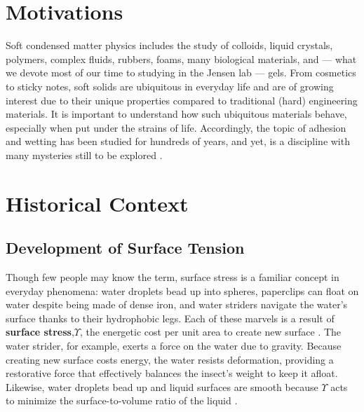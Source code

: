 

\section{Motivations}
Soft condensed matter physics includes the study of colloids, liquid crystals, polymers, complex fluids, rubbers, foams, many biological materials, and --- what we devote most of our time to studying in the Jensen lab --- gels. From cosmetics to sticky notes, soft solids are ubiquitous in everyday life and are of growing interest due to their unique properties compared to traditional (hard) engineering materials.  It is important to understand how such ubiquitous materials behave, especially when put under the strains of life. Accordingly, the topic of adhesion and wetting has been studied for hundreds of years, and yet, is a discipline with many mysteries still to be explored  \cite{GennesPierre-Gillesde2003Cawp}. 

 
\section{Historical Context}
\subsection{Development of Surface Tension}
Though few people may know the term, surface stress is a familiar concept in everyday phenomena: water droplets bead up into spheres, paperclips can float on water despite being made of dense iron, and water striders navigate the water's surface thanks to their hydrophobic legs. Each of these marvels is a result of \textbf{surface stress},$\Upsilon$, the  energetic cost per unit area to create new surface \cite{cammarata1994surface}. The water strider, for example, exerts a force on the water due to gravity. Because creating new surface costs energy, the water resists deformation, providing a restorative force that effectively balances the insect’s weight to keep it afloat. Likewise, water droplets bead up and liquid surfaces are smooth because $\Upsilon$ acts to minimize the surface-to-volume ratio of the liquid \cite{gibbs1906scientific,GennesPierre-Gillesde2003Cawp}. 

